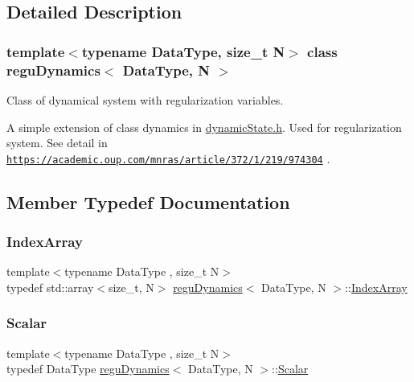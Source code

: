 \subsection{Detailed Description}
\subsubsection*{template$<$typename Data\+Type, size\+\_\+t N$>$\newline
class regu\+Dynamics$<$ Data\+Type, N $>$}

Class of dynamical system with regularization variables. 

A simple extension of class dynamics in \mbox{\hyperlink{dynamic_state_8h}{dynamic\+State.\+h}}. Used for regularization system. See detail in \href{https://academic.oup.com/mnras/article/372/1/219/974304}{\tt https\+://academic.\+oup.\+com/mnras/article/372/1/219/974304} . 

\subsection{Member Typedef Documentation}
\mbox{\label{classregu_dynamics_a2c9fa7372e4a11be9d85728b4a0e455f}} 
\subsubsection{\texorpdfstring{Index\+Array}{IndexArray}}
{\footnotesize\ttfamily template$<$typename Data\+Type , size\+\_\+t N$>$ \\
typedef std\+::array$<$size\+\_\+t, N$>$ \mbox{\hyperlink{classregu_dynamics}{regu\+Dynamics}}$<$ Data\+Type, N $>$\+::\mbox{\hyperlink{classregu_dynamics_a2c9fa7372e4a11be9d85728b4a0e455f}{Index\+Array}}}

\mbox{\label{classregu_dynamics_a359c55370b4dee032396f0df86ad5fab}} 
\subsubsection{\texorpdfstring{Scalar}{Scalar}}
{\footnotesize\ttfamily template$<$typename Data\+Type , size\+\_\+t N$>$ \\
typedef Data\+Type \mbox{\hyperlink{classregu_dynamics}{regu\+Dynamics}}$<$ Data\+Type, N $>$\+::\mbox{\hyperlink{classregu_dynamics_a359c55370b4dee032396f0df86ad5fab}{Scalar}}}

